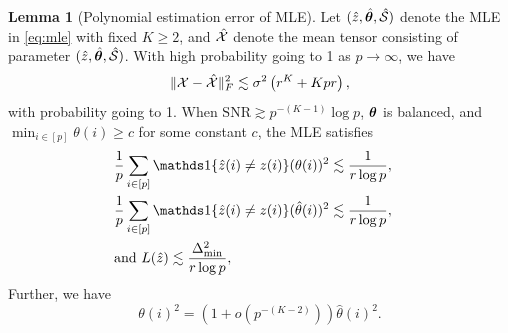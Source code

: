 \documentclass[journal]{IEEEtran}
\theoremstyle{definition}
\newtheorem{lem}{Lemma}
\theoremstyle{definition}
\newcommand{\of}[1]{\left(#1\right)}
\begin{document}
    
   
\begin{lem}[Polynomial estimation error of MLE]\label{lem:poly_mle_degree}  Let $(\hat z, \hat {\boldsymbol{\theta}}, \hat {\mathcal{S}})$ denote the MLE in \eqref{eq:mle} {with fixed $K \geq 2$}, and $\hat {\mathcal{X}}$ denote the mean tensor consisting of parameter $(\hat z, \hat {\boldsymbol{\theta}}, \hat {\mathcal{S}})$. {With high probability going to 1 as $p \rightarrow \infty$, we} have 
\begin{equation}
    \onormSize{}{\tX - \hat \tX}_F^2 \lesssim \sigma^2 \of{ r^{K} + K p r},
\end{equation}
with probability going to 1. 
When {$\text{SNR} \gtrsim p^{-(K-1)} \log p$,  $\boldsymbol{\theta}$ is balanced, and $\min_{i \in [p]} \theta(i) \geq c$ for some constant $c$}, the MLE satisfies
\begin{align}
    &\frac{1}{p} \sum_{i \in [p]} \ind\{ \hat z(i) \neq z(i) \} (\theta(i))^2 \lesssim \frac{1}{r \log p}, \quad\\
    &\frac{1}{p} \sum_{i \in [p]} \ind\{ \hat z(i) \neq z(i) \} (\hat \theta(i))^2 \lesssim \frac{1}{r \log p} ,\quad   \\
    & \text{and } L(\hat z) \lesssim \frac{\Delta_{\min}^2}{r \log p},
\end{align}
Further, we have 
\begin{equation}
     \theta(i)^2 = (1 + o(p^{-(K-2)})) \hat \theta(i)^2.
 \end{equation}
\end{lem}
\end{document}
